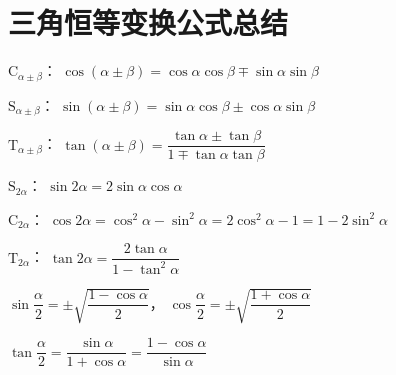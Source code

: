 \section{三角恒等变换公式总结}
  \begin{description}[leftmargin=0pt,labelsep=0pt]
    \item%
      \begin{itemizeMy}
        \item $\mathrm{C}_{\alpha\pm\beta}$：
        $\cos(\alpha\pm\beta)=\cos\alpha\cos\beta \mp \sin\alpha\sin\beta$
        \item $\mathrm{S}_{\alpha\pm\beta}$：
        $\sin(\alpha\pm\beta)=\sin\alpha\cos\beta \pm \cos\alpha\sin\beta$
        \item $\mathrm{T}_{\alpha\pm\beta}$：
        $\tan(\alpha\pm\beta)=\dfrac{\tan\alpha\pm \tan\beta}{1\mp\tan\alpha\tan\beta}$
      \end{itemizeMy}
    \item%
      \begin{itemizeMy}
        \item $\mathrm{S}_{2\alpha}$：
        $\sin{2\alpha}=2\sin\alpha\cos\alpha$
        \item $\mathrm{C}_{2\alpha}$：
        $\cos{2\alpha}=\cos^2{\alpha}-\sin^2{\alpha}=2\cos^2\alpha-1=1-2\sin^2\alpha$
        \item $\mathrm{T}_{2\alpha}$：
        $\tan{2\alpha}=\dfrac{2\tan\alpha}{1-\tan^2\alpha}$
      \end{itemizeMy}
      \item%
        \begin{itemizeMy}
          \item $\sin{\dfrac{\alpha}2}=\pm\sqrt{\dfrac{1-\cos\alpha}2}$，
                $\cos{\dfrac{\alpha}2}=\pm\sqrt{\dfrac{1+\cos\alpha}2}$
          \item $\tan{\dfrac{\alpha}2}=\dfrac{\sin\alpha}{1+\cos\alpha}=\dfrac{1-\cos\alpha}{\sin\alpha}$
        \end{itemizeMy}

\end{description}
